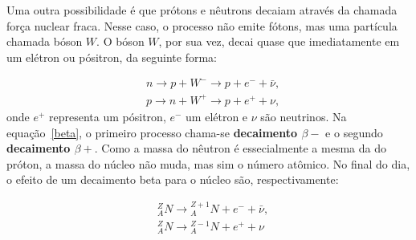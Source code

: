 \documentclass{article}
\begin{document}
Uma outra possibilidade \'e que pr\'otons e n\^eutrons decaiam atrav\'es da chamada for\c ca nuclear fraca. Nesse caso, o processo n\~ao emite f\'otons, mas uma part\'icula chamada b\'oson $W$. O b\'oson $W$, por sua vez, decai quase que imediatamente em um el\'etron ou p\'ositron, da seguinte forma:

\begin{equation}\label{beta}
\begin{split}
&n \rightarrow p + W^-\rightarrow p + e^- + \bar{\nu},\\
&p \rightarrow n + W^+\rightarrow p + e^+ + \nu,
\end{split}
\end{equation}
onde $e^+$ representa um p\'ositron, $e^-$ um el\'etron e $\nu$ s\~ao neutrinos. Na equa\c c\~ao~\eqref{beta}, o primeiro processo chama-se \textbf{decaimento $\beta -$} e o segundo \textbf{decaimento $\beta +$}. Como a massa do n\^eutron \'e essecialmente a mesma da do pr\'oton, a massa do n\'ucleo n\~ao muda, mas sim o n\'umero at\^omico. No final do dia, o efeito de um decaimento beta para o n\'ucleo s\~ao, respectivamente:

\begin{equation}
\begin{split}
&{}^Z_AN \rightarrow {}^{Z+1}_AN + e^- + \bar{\nu},\\
&{}^Z_AN \rightarrow {}^{Z-1}_AN + e^+ + \nu
\end{split}
\end{equation}
\end{document}
